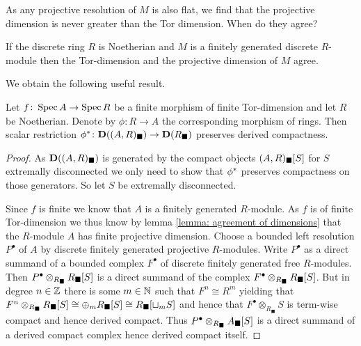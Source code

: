 As any projective resolution of $M$ is also flat, we find that the projective dimension is never greater than the Tor dimension. When do they agree?
\begin{lemma}
	\label{lemma: agreement of dimensions}
	
	If the discrete ring $R$ is Noetherian and $M$ is a finitely generated discrete $R$-module then the Tor-dimension and the projective dimension of $M$ agree.
\end{lemma}

We obtain the following useful result.
\begin{lemma}
	\label{lemma: scalar restriction preserves compactness for finite Tor-dimension}
	
	Let $f\colon \operatorname{Spec} A\to\operatorname{Spec} R$ be a finite morphism of finite Tor-dimension and let $R$ be Noetherian. Denote by $\phi\colon R\to A$ the corresponding morphism of rings. Then scalar restriction ${\phi^\ast}\colon {{\mathbf{D}}((A, R)_\blacksquare)}\to {{\mathbf{D}}(R_\blacksquare)}$ preserves derived compactness.
\end{lemma}
\begin{proof}
	As ${{\mathbf{D}}((A, R)_\blacksquare)}$ is generated by the compact objects ${(A, R)_\blacksquare[S]}$ for $S$ extremally disconnected we only need to show that ${\phi^\ast}$ preserves compactness on those generators. So let $S$ be extremally disconnected.
	
	Since $f$ is finite we know that $A$ is a finitely generated $R$-module. As $f$ is of finite Tor-dimension we thus know by lemma \ref{lemma: agreement of dimensions} that the $R$-module $A$ has finite projective dimension. Choose a bounded left resolution $P^\bullet$ of $A$ by discrete finitely generated projective $R$-modules. Write $P^\bullet$ as a direct summand of a bounded complex $F^\bullet$ of discrete finitely generated free $R$-modules. Then $P^\bullet \otimes_{R_\blacksquare} {R_\blacksquare[S]}$ is a direct summand of the complex $F^\bullet \otimes_{R_\blacksquare} {R_\blacksquare[S]}$. But in degree $n \in {\mathbb{Z}}$ there is some $m\in {\mathbb{N}}$ such that $F^n\cong R^m$ yielding that $F^n \otimes_{R_\blacksquare} {R_\blacksquare[S]} \cong \oplus_m {R_\blacksquare[S]} \cong {R_\blacksquare[\sqcup_m S]}$ and hence that $F^\bullet \otimes_{R_\blacksquare}{S}$ is term-wise compact and hence derived compact. Thus $P^\bullet \otimes_{R_\blacksquare} {A_\blacksquare[S]}$ is a direct summand of a derived compact complex hence derived compact itself.
\end{proof}

